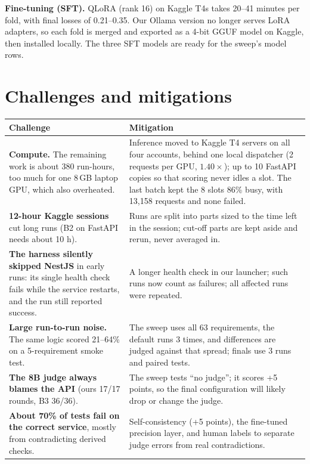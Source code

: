 \documentclass[11pt,a4paper]{article}
\begin{document}
\textbf{Fine-tuning (SFT).} QLoRA (rank 16) on Kaggle T4s takes 20--41 minutes per fold, with final losses of 0.21--0.35. Our Ollama version no longer serves LoRA adapters, so each fold is merged and exported as a 4-bit GGUF model on Kaggle, then installed locally. The three SFT models are ready for the sweep's model rows.

\section{Challenges and mitigations}
\begin{table}[H]\centering\small
\begin{tabularx}{\linewidth}{@{}LL@{}}\toprule
\textbf{Challenge} & \textbf{Mitigation}\\\midrule
\textbf{Compute.} The remaining work is about 380 run-hours, too much for one 8\,GB laptop GPU, which also overheated. & Inference moved to Kaggle T4 servers on all four accounts, behind one local dispatcher (2 requests per GPU, $1.40\times$); up to 10 FastAPI copies so that scoring never idles a slot. The last batch kept the 8 slots 86\% busy, with 13{,}158 requests and none failed.\\
\textbf{12-hour Kaggle sessions} cut long runs (B2 on FastAPI needs about 10 h). & Runs are split into parts sized to the time left in the session; cut-off parts are kept aside and rerun, never averaged in.\\
\textbf{The harness silently skipped NestJS} in early runs: its single health check fails while the service restarts, and the run still reported success. & A longer health check in our launcher; such runs now count as failures; all affected runs were repeated.\\
\textbf{Large run-to-run noise.} The same logic scored 21--64\% on a 5-requirement smoke test. & The sweep uses all 63 requirements, the default runs 3 times, and differences are judged against that spread; finals use 3 runs and paired tests.\\
\textbf{The 8B judge always blames the API} (ours 17/17 rounds, B3 36/36). & The sweep tests ``no judge''; it scores +5 points, so the final configuration will likely drop or change the judge.\\
\textbf{About 70\% of tests fail on the correct service}, mostly from contradicting derived checks. & Self-consistency (+5 points), the fine-tuned precision layer, and human labels to separate judge errors from real contradictions.\\

\end{tabularx}
\end{table}
\end{document}
